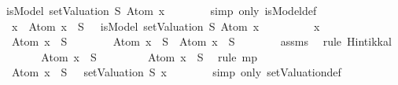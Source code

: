 \begin{isabellebody}
\ {\isachardoublequoteopen}isModel\ {\isacharparenleft}setValuation\ S{\isacharparenright}\ {\isacharparenleft}Atom\ x{\isacharparenright}{\isachardoublequoteclose}\isanewline
\ \ \ \ \ \ \isamarkupfalse%
\ {\isacharparenleft}simp\ only{\isacharcolon}\ isModel{\isacharunderscore}def{\isacharparenright}\isanewline
\ \ \isamarkupfalse%
\isanewline
{}\isamarkupfalse%
\ \isanewline
\ \ \isamarkupfalse%
\ \isanewline
\ \ {\isachardoublequoteopen}{\isasymAnd}x{\isachardot}\ \isactrlbold {\isasymnot}\ {\isacharparenleft}Atom\ x{\isacharparenright}\ {\isasymin}\ S\ {\isasymlongrightarrow}\ {\isasymnot}\ isModel\ {\isacharparenleft}setValuation\ S{\isacharparenright}\ {\isacharparenleft}Atom\ x{\isacharparenright}{\isachardoublequoteclose}\ \isanewline
\ \ \isamarkupfalse%
\isanewline
\ \ \ \ \isamarkupfalse%
\ x\isanewline
\ \ \ \ \isamarkupfalse%
\ {\isachardoublequoteopen}\isactrlbold {\isasymnot}\ {\isacharparenleft}Atom\ x{\isacharparenright}\ {\isasymin}\ S{\isachardoublequoteclose}\ \isanewline
\ \ \ \ \isamarkupfalse%
\ {\isachardoublequoteopen}\isactrlbold {\isasymnot}\ {\isacharparenleft}Atom\ x{\isacharparenright}\ {\isasymin}\ S\ {\isasymlongrightarrow}\ Atom\ x\ {\isasymnotin}\ S{\isachardoublequoteclose}\isanewline
\ \ \ \ \ \ \isamarkupfalse%
\ assms\ \isamarkupfalse%
\ {\isacharparenleft}rule\ Hintikka{\isacharunderscore}l{}{}{\isacharparenright}\isanewline
\ \ \ \ \isamarkupfalse%
\ \isamarkupfalse%
\ {\isachardoublequoteopen}Atom\ x\ {\isasymnotin}\ S{\isachardoublequoteclose}\isanewline
\ \ \ \ \ \ \isamarkupfalse%
\ {\isacartoucheopen}\isactrlbold {\isasymnot}\ {\isacharparenleft}Atom\ x{\isacharparenright}\ {\isasymin}\ S{\isacartoucheclose}\ \isamarkupfalse%
\ {\isacharparenleft}rule\ mp{\isacharparenright}\isanewline
\ \ \ \ \isamarkupfalse%
\ \isamarkupfalse%
\ {\isachardoublequoteopen}{\isacharparenleft}{\isasymnot}\ {\isacharparenleft}Atom\ x\ {\isasymin}\ S{\isacharparenright}{\isacharparenright}\ {\isacharequal}\ {\isacharparenleft}{\isasymnot}\ {\isacharparenleft}setValuation\ S{\isacharparenright}\ x{\isacharparenright}{\isachardoublequoteclose}\isanewline
\ \ \ \ \ \ \isamarkupfalse%
\ {\isacharparenleft}simp\ only{\isacharcolon}\ setValuation{\isacharunderscore}def{\isacharparenright}\isanewline
\ \ \ \ \isamarkupfalse%

\end{isabellebody}
